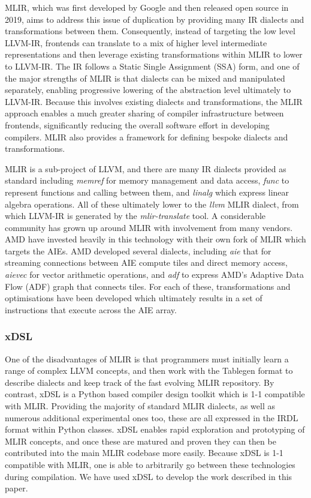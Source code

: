 MLIR, which was first developed by Google and then released open source in 2019, aims to address this issue of duplication by providing many IR dialects and transformations between them. Consequently, instead of targeting the low level LLVM-IR, frontends can translate to a mix of higher level intermediate representations and then leverage existing transformations within MLIR to lower to LLVM-IR. The IR follows a Static Single Assignment (SSA) form, and one of the major strengths of MLIR is that dialects can be mixed and manipulated separately, enabling progressive lowering of the abstraction level ultimately to LLVM-IR.  Because this involves existing dialects and transformations, the MLIR approach enables a much greater sharing of compiler infrastructure between frontends, significantly reducing the overall software effort in developing compilers. MLIR also provides a framework for defining bespoke dialects and transformations. 

MLIR is a sub-project of LLVM, and there are many IR dialects provided as standard including \emph{memref} for memory management and data access, \emph{func} to represent functions and calling between them, and \emph{linalg} which express linear algebra operations. All of these ultimately lower to the \emph{llvm} MLIR dialect, from which LLVM-IR is generated by the \emph{mlir-translate} tool. A considerable community has grown up around MLIR with involvement from many vendors. AMD have invested heavily in this technology with their own fork of MLIR which targets the AIEs. AMD developed several dialects, including \emph{aie} that for streaming connections between AIE compute tiles and direct memory access, \emph{aievec} for vector arithmetic operations, and \emph{adf} to express AMD's Adaptive Data Flow (ADF) graph that connects tiles. For each of these, transformations and optimisations have been developed which ultimately results in a set of instructions that execute across the AIE array.

\subsubsection{xDSL}

One of the disadvantages of MLIR is that programmers must initially learn a range of complex LLVM concepts, and then work with the Tablegen format to describe dialects and keep track of the fast evolving MLIR repository. By contrast, xDSL \cite{xdsl} is a Python based compiler design toolkit which is 1-1 compatible with MLIR. Providing the majority of standard MLIR dialects, as well as numerous additional experimental ones too, these are all expressed in the IRDL \cite{fehr2022irdl} format within Python classes. xDSL enables rapid exploration and prototyping of MLIR concepts, and once these are matured and proven they can then be contributed into the main MLIR codebase  more easily. Because xDSL is 1-1 compatible with MLIR, one is able to arbitrarily go between these technologies during compilation. We have used xDSL to develop the work described in this paper.

